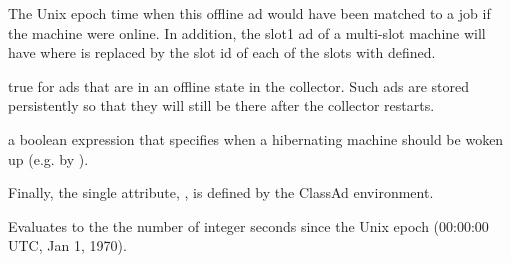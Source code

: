 \begin{description}

\item[\AdAttr{MachineLastMatchTime}:] The Unix epoch time when this offline ad
would have been matched to a job if the machine were online.  In addition,
the slot1 ad of a multi-slot machine will have 
where  is replaced by the slot id of each of the slots
with  defined.

\item[\AdAttr{Offline}:] true for ads that are in an offline state
in the collector.  Such ads are stored persistently so that they will
still be there after the collector restarts.

\item[\AdAttr{Unhibernate}:] a boolean expression that specifies when
a hibernating machine should be woken up (e.g. by ).

\end{description}

Finally, the single attribute, 
, is defined by the ClassAd
environment.
\begin{description}
\item[\AdAttr{CurrentTime}:] Evaluates to the 
the number of integer seconds since the Unix epoch (00:00:00 UTC, Jan 1, 1970).
\end{description}

